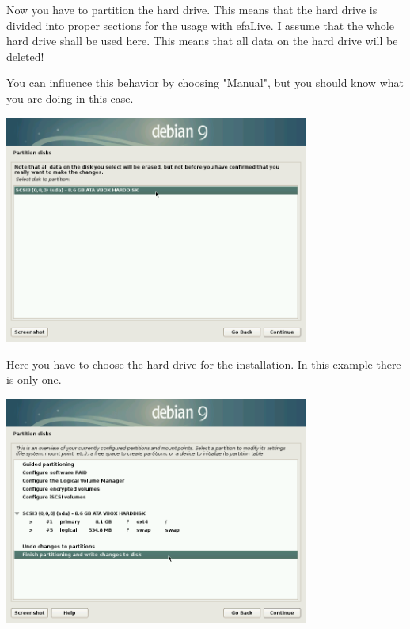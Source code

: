 \documentclass[a4paper,12pt,twoside]{article}
\begin{document}
Now you have to partition the hard drive. This means that the hard drive
is divided into proper sections for the usage with efaLive. I assume
that the whole hard drive shall be used here. This means that all data
on the hard drive will be deleted!

You can influence this behavior by choosing
"Manual", but you should know what you are
doing in this case.

\bigskip
\begin{minipage}{\linewidth}
    \centering
    \captionsetup{type=figure}
    \includegraphics[width=10cm]{screenshots/select_drive.png}
    \label{fig:auswahl_festplatte}
\end{minipage}
\bigskip

Here you have to choose the hard drive for the installation. In this
example there is only one.

\bigskip
\begin{minipage}{\linewidth}
    \centering
    \captionsetup{type=figure}
    \includegraphics[width=10cm]{screenshots/accept_partitioning.png}
    \label{fig:conf_partitioning}
\end{minipage}
\bigskip
\end{document}
